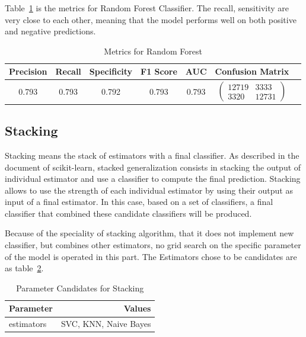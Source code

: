 Table~\ref{tab:rf} is the metrics for Random Forest Classifier. The recall, sensitivity are very close to each other, meaning that the model performs well on both positive and negative predictions.

\begin{table}
\centering
\begin{tabular}{|c|c|c|c|c|c|c}
\hline
\textbf{Precision} & \textbf{Recall} & \textbf{Specificity} & \textbf{F1 Score} & \textbf{AUC} & \textbf{Confusion Matrix} \\
\hline
0.793 & 0.793 & 0.792 & 0.793 & 0.793 & $\left(\begin{array}{cc} 12719 & 3333 \\ 3320 & 12731 \end{array}\right)$ \\ 
\hline
\end{tabular}
\caption{Metrics for Random Forest}
\label{tab:rf}
\end{table}

\subsection{Stacking}

Stacking means the stack of estimators with a final classifier. As described in the document of scikit-learn, stacked generalization consists in stacking the output of individual estimator and use a classifier to compute the final prediction. Stacking allows to use the strength of each individual estimator by using their output as input of a final estimator. In this case, based on a set of classifiers, a final classifier that combined these candidate classifiers will be produced.

Because of the speciality of stacking algorithm, that it does not implement new classifier, but combines other estimators, no grid search on the specific parameter of the model is operated in this part. The Estimators chose to be candidates are as table~\ref{tab:parameters-stacking}.

\begin{table}[h]
\centering
\begin{tabular}{|l|r|}
\hline
\textbf{Parameter}        & \textbf{Values}         \\ \hline
estimators             & SVC, KNN, Naive Bayes                \\ \hline
\end{tabular}
\caption{Parameter Candidates for Stacking}
\label{tab:parameters-stacking}
\end{table}

